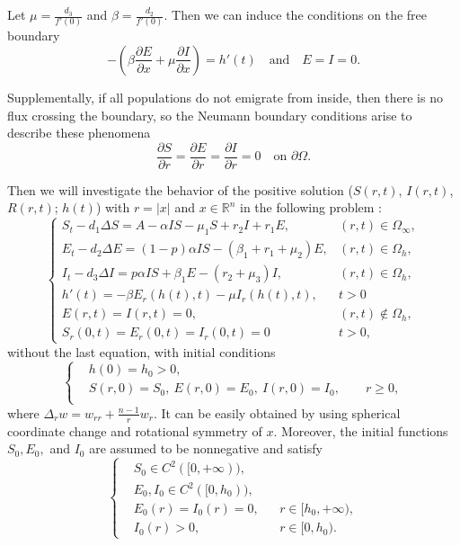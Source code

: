 \documentclass[11pt]{amsart}
\numberwithin{equation}{section}
\theoremstyle{plain}
\theoremstyle{definition}
\begin{document}
 	Let $\mu = \frac{d_3}{f'(0)}$ and $\beta = \frac{d_2}{f'(0)}$. Then we can induce the conditions on the free boundary
 	\begin{equation*}
 		-\left(\beta\frac{\partial E}{\partial x}+\mu \frac{\partial I}{\partial x}\right)= h'(t) \quad \text{and} \quad E=I=0.
 	\end{equation*}
 	
 	Supplementally, if all populations do not emigrate from inside, then there is no flux crossing the boundary, so the Neumann boundary conditions arise to describe these phenomena
 	\begin{equation*}
 		\frac{\partial S}{\partial r}=\frac{\partial E}{\partial r}=\frac{\partial I}{\partial r}=0 \quad \text{on } \partial \Omega.
 	\end{equation*}
 	
 	Then we will investigate the behavior of the positive solution ($S\left(r,t\right)$, $I\left(r,t\right)$, $R\left(r,t\right)$; $h\left(t\right)$) with $r=\lvert x \rvert$ and $x \in \mathbb{R}^n$ in the following problem :
 	\begin{equation} \label{free boundary SEIS}
 	\begin{cases}
			S_t-d_1\Delta S=A-\alpha IS-\mu_1 S+r_2 I+r_1E, &(r,t)\in\Omega_\infty,\\
			E_t-d_2\Delta E=(1-p)\alpha IS-(\beta_1 +r_1+\mu_2) E, &(r,t) \in \Omega_h,\\
			I_t-d_3\Delta I=p\alpha IS+\beta_1 E-(r_2+\mu_3) I, &(r,t) \in \Omega_h,\\
			h'(t)=-\beta E_r(h(t),t)-\mu I_r(h(t),t), &t>0\\
			E(r,t)=I(r,t)=0, &(r,t)\notin \Omega_h,\\
			S_r(0,t)=E_r(0,t)=I_r(0,t)=0 &t>0,
	\end{cases}
	\end{equation}
	without the last equation, with initial conditions
	\begin{equation} \label{initial cond}
		\left \{ \begin{aligned}
			&h(0)=h_0>0, \\
			&S(r,0)=S_0,\ E(r,0)=E_0,\ I(r,0)=I_0, \qquad r\geq0, \\
		\end{aligned} \right.
	\end{equation}
 	where $\Delta_r w = w_{rr}+\frac{n-1}{r}w_r$. It can be easily obtained by using spherical coordinate change and rotational symmetry of $x$. Moreover, the initial functions $S_0, E_0,$ and $I_0$ are assumed to be nonnegative and satisfy
 	\begin{equation} \label{cond for initial cond}
 		\left \{ \begin{aligned}
 			&S_0 \in C^2([0,+\infty)),\\
 			&E_0, I_0 \in C^2([0,h_0)),\\
 			&E_0(r)=I_0(r)=0, &&r \in[h_0,+\infty),\\
 			&I_0(r)>0, && r \in [0,h_0).
 		\end{aligned} \right.
 	\end{equation}
\end{document}
